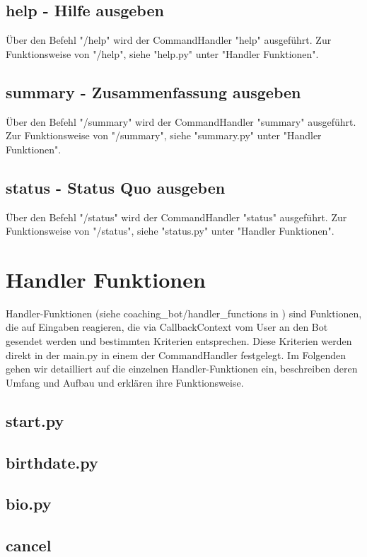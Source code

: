 \subsection{help - Hilfe ausgeben}
Über den Befehl "/help" wird der CommandHandler "help" ausgeführt. Zur Funktionsweise von "/help", siehe "help.py" unter "Handler Funktionen". 

\subsection{summary - Zusammenfassung ausgeben}
Über den Befehl "/summary" wird der CommandHandler "summary" ausgeführt. Zur Funktionsweise von "/summary", siehe "summary.py" unter "Handler Funktionen". 

\subsection{status - Status Quo ausgeben}
Über den Befehl "/status" wird der CommandHandler "status" ausgeführt. Zur Funktionsweise von "/status", siehe "status.py" unter "Handler Funktionen". 


\section{Handler Funktionen}
Handler-Funktionen (siehe coaching_bot/handler_functions in \cite{repo}) sind Funktionen, die auf Eingaben reagieren, die via CallbackContext vom User an den Bot gesendet werden und bestimmten Kriterien entsprechen. Diese Kriterien werden direkt in der main.py in einem der CommandHandler festgelegt. Im Folgenden gehen wir detailliert auf die einzelnen Handler-Funktionen ein, beschreiben deren Umfang und Aufbau und erklären ihre Funktionsweise. 

\subsection{start.py}

\subsection{birthdate.py}

\subsection{bio.py}

\subsection{cancel}

